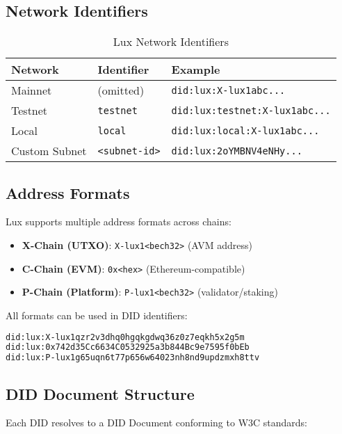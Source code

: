 \documentclass[11pt,a4paper]{article}
\begin{document}
\subsection{Network Identifiers}

\begin{table}[h]
\centering
\begin{tabular}{@{}lll@{}}
\toprule
\textbf{Network} & \textbf{Identifier} & \textbf{Example} \\ \midrule
Mainnet & (omitted) & \texttt{did:lux:X-lux1abc...} \\
Testnet & \texttt{testnet} & \texttt{did:lux:testnet:X-lux1abc...} \\
Local & \texttt{local} & \texttt{did:lux:local:X-lux1abc...} \\
Custom Subnet & \texttt{<subnet-id>} & \texttt{did:lux:2oYMBNV4eNHy...} \\ \bottomrule
\end{tabular}
\caption{Lux Network Identifiers}
\end{table}

\subsection{Address Formats}

Lux supports multiple address formats across chains:

\begin{itemize}
  \item \textbf{X-Chain (UTXO)}: \texttt{X-lux1<bech32>} (AVM address)
  \item \textbf{C-Chain (EVM)}: \texttt{0x<hex>} (Ethereum-compatible)
  \item \textbf{P-Chain (Platform)}: \texttt{P-lux1<bech32>} (validator/staking)
\end{itemize}

All formats can be used in DID identifiers:

\begin{lstlisting}[language=bash, caption=Valid Lux DIDs]
did:lux:X-lux1qzr2v3dhq0hgqkgdwq36z0z7eqkh5x2g5m
did:lux:0x742d35Cc6634C0532925a3b844Bc9e7595f0bEb
did:lux:P-lux1g65uqn6t77p656w64023nh8nd9updzmxh8ttv
\end{lstlisting}

\subsection{DID Document Structure}

Each DID resolves to a DID Document conforming to W3C standards:
\end{document}
